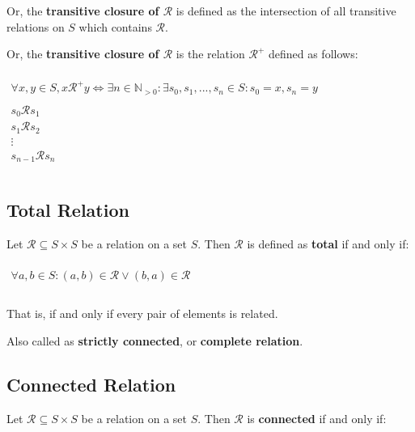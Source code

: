 Or, the \textbf{transitive closure of $\mathcal{R}$} is defined as the
intersection of all transitive relations on $S$ which contains
$\mathcal{R}$.

Or, the \textbf{transitive closure of $\mathcal{R}$} is the relation
$\mathcal{R}^+$ defined as follows:


\begin{math}
  \begin{array}{c}
    \\
    \forall x, y \in S, x \mathcal{R}^+ y \iff \exists n \in \mathbb{N}_{>0} : \exists s_0, s_1, ..., s_n \in S: s_0 = x, s_n = y \\
    \\
    s_0 \mathcal{R} s_1\\
    s_1 \mathcal{R} s_2\\
    \vdots\\
    s_{n-1} \mathcal{R} s_n \\
    \\
  \end{array}
\end{math}


\subsection{Total Relation}
\label{sec:total-relation}

Let $\mathcal{R} \subseteq S \times S$ be a relation on a set
$S$. Then $\mathcal{R}$ is defined as \textbf{total} if and only if:

\begin{math}
  \begin{array}{c}
    \\
    \forall a, b \in S : (a, b) \in \mathcal{R} \lor (b, a) \in \mathcal{R} \\
    \\
  \end{array}
\end{math}

That is, if and only if every pair of elements is related.

Also called as \textbf{strictly connected}, or \textbf{complete
  relation}.

\subsection{Connected Relation}
\label{sec:connected-relation}

Let $\mathcal{R} \subseteq S \times S$ be a relation on a set
$S$. Then $\mathcal{R}$ is \textbf{connected} if and only if:

